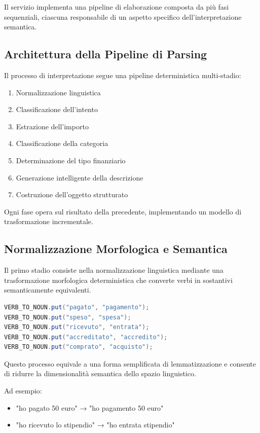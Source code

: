 Il servizio implementa una pipeline di elaborazione composta da più fasi sequenziali, ciascuna responsabile di un aspetto specifico dell'interpretazione semantica.

\subsection{Architettura della Pipeline di Parsing}

Il processo di interpretazione segue una pipeline deterministica multi-stadio:

\begin{enumerate}
    \item Normalizzazione linguistica
    \item Classificazione dell'intento
    \item Estrazione dell'importo
    \item Classificazione della categoria
    \item Determinazione del tipo finanziario
    \item Generazione intelligente della descrizione
    \item Costruzione dell'oggetto strutturato
\end{enumerate}

Ogni fase opera sul risultato della precedente, implementando un modello di trasformazione incrementale.

\subsection{Normalizzazione Morfologica e Semantica}

Il primo stadio consiste nella normalizzazione linguistica mediante una trasformazione morfologica deterministica che converte verbi in sostantivi semanticamente equivalenti.

\medskip

\begin{lstlisting}[language=Java]
VERB_TO_NOUN.put("pagato", "pagamento");
VERB_TO_NOUN.put("speso", "spesa");
VERB_TO_NOUN.put("ricevuto", "entrata");
VERB_TO_NOUN.put("accreditato", "accredito");
VERB_TO_NOUN.put("comprato", "acquisto");
\end{lstlisting}

Questo processo equivale a una forma semplificata di lemmatizzazione e consente di ridurre la dimensionalità semantica dello spazio linguistico.

Ad esempio:

\begin{itemize}
    \item "ho pagato 50 euro" → "ho pagamento 50 euro"
    \item "ho ricevuto lo stipendio" → "ho entrata stipendio"
\end{itemize}


